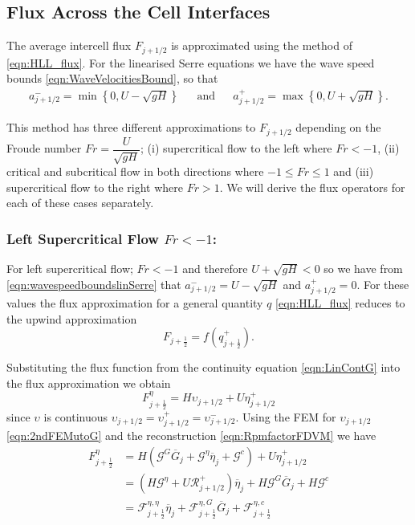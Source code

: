 \subsection{Flux Across the Cell Interfaces}
The average intercell flux $F_{j+1/2}$ is approximated using the method of \citet{Kurganov-etal-2001-707} \eqref{eqn:HLL_flux}. For the linearised Serre equations we have the wave speed bounds \eqref{eqn:WaveVelocitiesBound}, so that
\begin{align}
a^-_{j+ 1/2} = \min \left\lbrace 0,  U - \sqrt{g H} \right \rbrace& &\text{and}& &a^+_{j+ 1/2} =  \max \left\lbrace 0, U + \sqrt{g H} \right \rbrace .
\label{eqn:wavespeedboundslinSerre}
\end{align}

This method has three different approximations to $F_{j+1/2}$ depending on the Froude number $Fr = \dfrac{U}{\sqrt{gH}}$; (i)
supercritical flow to the left where $Fr < -1$, (ii) critical and subcritical flow in both directions where $-1 \le Fr \le 1$ and (iii) supercritical flow to the right where $Fr > 1$. We will derive the flux operators for each of these cases separately.

\subsubsection{Left Supercritical Flow $Fr < -1$:}
For left supercritical flow; $Fr < -1$ and therefore $U + \sqrt{g H} < 0$ so we have from \eqref{eqn:wavespeedboundslinSerre} that $a^-_{j+ 1/2} = U - \sqrt{g H}$ and $a^+_{j+ 1/2} =  0$. For these values the flux approximation for a general quantity $q$ \eqref{eqn:HLL_flux} reduces to the upwind approximation 
\begin{equation}
F_{j+\frac{1}{2}} = f\left(q^+_{j+\frac{1}{2}}\right).
\label{eqn:fluxleftsupercrit}
\end{equation}

Substituting the flux function from the continuity equation \eqref{eqn:LinContG} into the flux approximation we obtain
\begin{equation*}
F^\eta_{j+\frac{1}{2}} = H \upsilon_{j+1/2} + U \eta^+_{j+1/2}
\end{equation*}
since $\upsilon$ is continuous $\upsilon_{j+1/2} = \upsilon_{j+1/2}^+ = \upsilon_{j+1/2}^- $. Using the FEM for $\upsilon_{j+1/2}$ \eqref{eqn:2ndFEMutoG} and the reconstruction \eqref{eqn:RpmfactorFDVM} we have
\begin{align}
F^\eta_{j+\frac{1}{2}} &= H \left(\mathcal{G}^G \overline{G}_{j} + \mathcal{G}^{\eta} \overline{\eta}_{j} + \mathcal{G}^c\right) + U \eta^+_{j+1/2} \nonumber \\ &= \left(H \mathcal{G}^{\eta} + U \mathcal{R}^+_{j+1/2} \right)  \overline{\eta}_{j} + H \mathcal{G}^G \overline{G}_{j} + H\mathcal{G}^c \nonumber \\
&= \mathcal{F}^{\eta, \eta}_{j+\frac{1}{2}} \overline{\eta}_{j} + \mathcal{F}^{\eta, G}_{j+\frac{1}{2}} \overline{G}_{j} + \mathcal{F}^{\eta, c}_{j+\frac{1}{2}}
\label{eqn:Fluxfactorsupercritetaleft}
\end{align}

